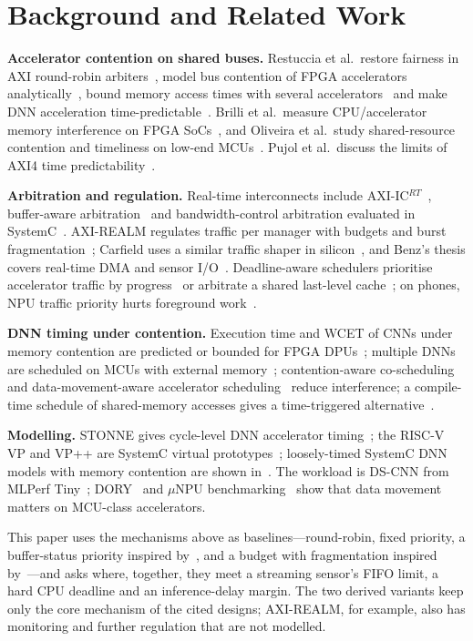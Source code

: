 \documentclass[conference]{IEEEtran}
\begin{document}
\section{Background and Related Work}\label{sec:related}
\textbf{Accelerator contention on shared buses.} Restuccia et al.\ restore fairness in AXI round-robin arbiters~\cite{restuccia19}, model bus contention of FPGA accelerators analytically~\cite{restuccia20}, bound memory access times with several accelerators~\cite{restuccia23} and make DNN acceleration time-predictable~\cite{restuccia21}. Brilli et al.\ measure CPU/accelerator memory interference on FPGA SoCs~\cite{brilli}, and Oliveira et al.\ study shared-resource contention and timeliness on low-end MCUs~\cite{oliveira}. Pujol et al.\ discuss the limits of AXI4 time predictability~\cite{pujol}.

\textbf{Arbitration and regulation.} Real-time interconnects include AXI-IC$^{RT}$~\cite{axiicrt}, buffer-aware arbitration~\cite{roh} and bandwidth-control arbitration evaluated in SystemC~\cite{sudo}. AXI-REALM regulates traffic per manager with budgets and burst fragmentation~\cite{axirealm}; Carfield uses a similar traffic shaper in silicon~\cite{carfield}, and Benz's thesis covers real-time DMA and sensor I/O~\cite{benz}. Deadline-aware schedulers prioritise accelerator traffic by progress~\cite{squash,dash} or arbitrate a shared last-level cache~\cite{flash}; on phones, NPU traffic priority hurts foreground work~\cite{sereno}.

\textbf{DNN timing under contention.} Execution time and WCET of CNNs under memory contention are predicted or bounded for FPGA DPUs~\cite{tpds,express,rtdpu}; multiple DNNs are scheduled on MCUs with external memory~\cite{rtmdm}; contention-aware co-scheduling~\cite{haxconn} and data-movement-aware accelerator scheduling~\cite{relief} reduce interference; a compile-time schedule of shared-memory accesses gives a time-triggered alternative~\cite{kirschner}.

\textbf{Modelling.} STONNE gives cycle-level DNN accelerator timing~\cite{stonne}; the RISC-V VP and VP++ are SystemC virtual prototypes~\cite{rvvp,vppp}; loosely-timed SystemC DNN models with memory contention are shown in~\cite{arasteh}. The workload is DS-CNN from MLPerf Tiny~\cite{mlperftiny}; DORY~\cite{dory} and $\mu$NPU benchmarking~\cite{unpu} show that data movement matters on MCU-class accelerators.

This paper uses the mechanisms above as baselines---round-robin, fixed priority, a buffer-status priority inspired by~\cite{roh}, and a budget with fragmentation inspired by~\cite{axirealm,carfield}---and asks where, together, they meet a streaming sensor's FIFO limit, a hard CPU deadline and an inference-delay margin. The two derived variants keep only the core mechanism of the cited designs; AXI-REALM, for example, also has monitoring and further regulation that are not modelled.
\end{document}
